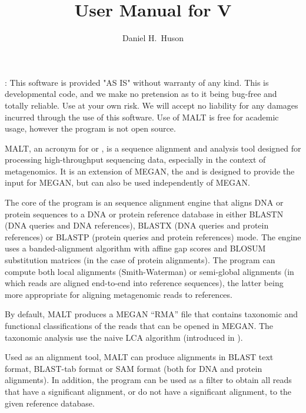 \documentclass[11pt]{article}
\title{\bf User Manual for \MALT V\VERSION}
\author{Daniel H.~Huson}
\newcommand\MALT{{\sf MALT}\xspace}
\begin{document}

\maketitle


{\small
\setcounter{tocdepth}{1}
\tableofcontents
}


:
This software is provided "AS IS" without warranty of any kind. This is 
developmental code, and we make no pretension as to it being bug-free and 
totally reliable. Use at your own risk. We will accept no liability for any 
damages incurred through the use of this software.
Use of  \MALT is free for academic usage, however the program is not open source.

\MALT, an acronym for  or , is a sequence alignment and analysis tool designed for processing high-throughput sequencing data, especially in the context of metagenomics.
It is an extension of MEGAN, the  and is designed to provide the input for MEGAN,
but can also be used independently of MEGAN.

The core of the program is an sequence alignment engine that aligns DNA or protein sequences
to a {DNA or} protein reference database in either {BLASTN (DNA queries and DNA references),}
BLASTX (DNA queries and protein references) or BLASTP (protein queries and protein references)
mode. The engine uses a banded-alignment algorithm with affine gap scores
and BLOSUM substitution matrices (in the case of protein alignments).
The program can compute both local alignments
(Smith-Waterman) or semi-global alignments (in which reads are aligned end-to-end into reference sequences), the latter being more appropriate for aligning metagenomic reads to references.

By default, \MALT produces a MEGAN ``RMA'' file that contains taxonomic and functional classifications of the reads
that can be opened in MEGAN.
The taxonomic analysis use the naive LCA algorithm (introduced in \cite{MEGAN2011}).

Used as an alignment tool,  \MALT can produce  alignments in BLAST  text format,
BLAST-tab format or SAM format (both for DNA and protein alignments).
In addition, the program can be used as a filter to obtain all reads that have a significant alignment, or
do not have a significant alignment, to the given reference database.
\end{document}
